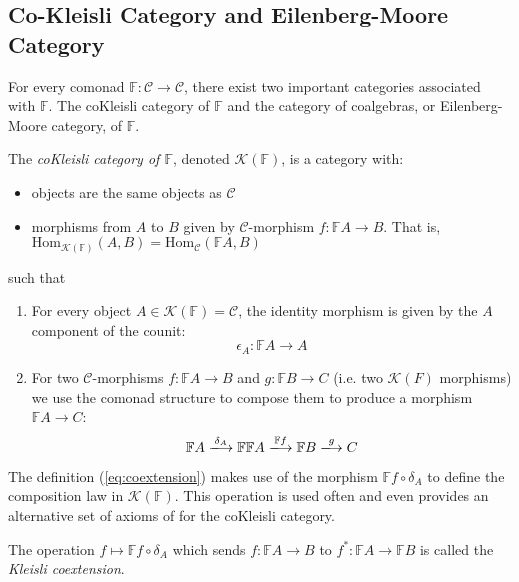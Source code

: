 \subsection{Co-Kleisli Category and Eilenberg-Moore Category}
For every comonad $\mathbb{F}:\mathcal{C} \longrightarrow \mathcal{C}$, there exist two important categories associated with $\mathbb{F}$. The coKleisli category of $\mathbb{F}$ and the category of coalgebras, or Eilenberg-Moore category, of $\mathbb{F}$. 
\begin{defn}
The \textit{coKleisli category of $\mathbb{F}$}, denoted $\mathcal{K}(\mathbb{F})$, is a category with:
\begin{itemize}
    \item objects are the same objects as $\mathcal{C}$
    \item morphisms from $A$ to $B$ given by $\mathcal{C}$-morphism $f:\mathbb{F}A \longrightarrow B$. That is, $\text{Hom}_{\mathcal{K}(\mathbb{F})}(A,B) = \text{Hom}_{\mathcal{C}}(\mathbb{F}A,B)$
\end{itemize}
such that 
\begin{enumerate}[label=(\arabic*)]
    \item For every object $A \in \mathcal{K}(\mathbb{F}) = \mathcal{C}$, the identity morphism is given by the $A$ component of the counit:  
    \begin{equation}
        \epsilon_{A}:\mathbb{F}A \longrightarrow A
    \end{equation}
    \item For two $\mathcal{C}$-morphisms $f:\mathbb{F}A \longrightarrow B$ and $g:\mathbb{F}B \longrightarrow C$ (i.e. two $\mathcal{K}(F)$ morphisms) we use the comonad structure to compose them to produce a morphism $\mathbb{F}A \longrightarrow C$:
    \begin{equation} 
        \mathbb{F}A \xlongrightarrow{\delta_{A}} \mathbb{F}\mathbb{F}A \xlongrightarrow{\mathbb{F}f} \mathbb{F}B \xlongrightarrow{g} C 
    \label{eq:coextension}
    \end{equation}
\end{enumerate}
\end{defn}
The definition (\ref{eq:coextension}) makes use of the morphism $\mathbb{F}f \circ \delta_{A}$ to define the composition law in $\mathcal{K}(\mathbb{F})$. This operation is used often and even provides an alternative set of axioms of for the coKleisli category. 
\begin{defn}
The operation $f \mapsto \mathbb{F}f \circ \delta_{A}$ which sends $f:\mathbb{F}A \longrightarrow B$ to $f^{*}: \mathbb{F}A \longrightarrow \mathbb{F}B$ is called the \textit{Kleisli coextension}. 
\end{defn}
